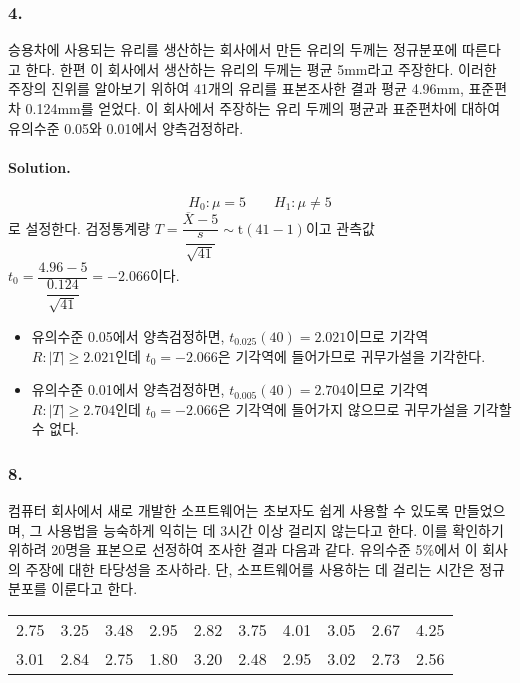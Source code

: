 \subsubsection{4.} 승용차에 사용되는 유리를 생산하는 회사에서 만든 유리의 두께는 정규분포에 따른다고 한다. 한편 이 회사에서 생산하는 유리의 두께는
평균 5mm라고 주장한다. 이러한 주장의 진위를 알아보기 위하여 41개의 유리를 표본조사한 결과 평균 4.96mm, 표준편차 0.124mm를 얻었다. 이 회사에서
주장하는 유리 두께의 평균과 표준편차에 대하여 유의수준 0.05와 0.01에서 양측검정하라.

\paragraph{Solution.}
\[H_0:\mu=5 \qquad H_1:\mu\neq5\]
로 설정한다. 검정통계량 $T=\dfrac{\overline{X}-5}{\dfrac{s}{\sqrt{41}}}\sim \mathrm{t}\left(41-1\right)$이고
관측값 $t_0=\dfrac{4.96-5}{\dfrac{0.124}{\sqrt{41}}}=-2.066$이다.
\begin{itemize}
    \item {
        유의수준 0.05에서 양측검정하면, $t_{0.025}\left(40\right)=2.021$이므로 기각역 $R:\left|T\right|\geq 2.021$인데
        $t_0=-2.066$은 기각역에 들어가므로 귀무가설을 기각한다.
    }
    \item {
        유의수준 0.01에서 양측검정하면, $t_{0.005}\left(40\right)=2.704$이므로 기각역 $R:\left|T\right|\geq 2.704$인데
        $t_0=-2.066$은 기각역에 들어가지 않으므로 귀무가설을 기각할 수 없다.
    }
\end{itemize}

\subsubsection{8.}컴퓨터 회사에서 새로 개발한 소프트웨어는 초보자도 쉽게 사용할 수 있도록 만들었으며,
그 사용법을 능숙하게 익히는 데 3시간 이상 걸리지 않는다고 한다. 이를 확인하기 위하려 20명을 표본으로 선정하여 조사한 결과 다음과 같다.
유의수준 5\%에서 이 회사의 주장에 대한 타당성을 조사하라. 단, 소프트웨어를 사용하는 데 걸리는 시간은 정규분포를 이룬다고 한다.

\begin{center}
    \begin{tabular}{cccccccccc}
        \hline
        2.75 & 3.25 & 3.48 & 2.95 & 2.82 & 3.75 & 4.01 & 3.05 & 2.67 & 4.25 \\
        3.01 & 2.84 & 2.75 & 1.80 & 3.20 & 2.48 & 2.95 & 3.02 & 2.73 & 2.56 \\
        \hline
    \end{tabular}
\end{center}

